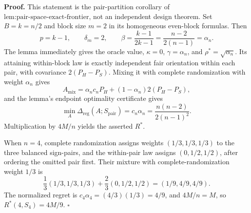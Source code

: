 \textbf{Proof.}
This statement is the pair-partition corollary of \(\text{lem:pair-space-exact-frontier}\), not an independent design theorem.  Set \(B=k=n/2\) and block size \(m=2\) in its homogeneous even-block formulas.  Then
\[
p=k-1,\qquad \delta_m=2,\qquad
\beta=\frac{k-1}{2k-1}=\frac{n-2}{2(n-1)}=\alpha_n.
\]
The lemma immediately gives the oracle value, \(\kappa=0\), \(\gamma=\alpha_n\), and \(\rho^*=\sqrt{\alpha_n}\).  Its attaining within-block law is exactly independent fair orientation within each pair, with covariance \(2(P_H-P_S)\).  Mixing it with complete randomization with weight \(\alpha_n\) gives
\[
A_{\mathrm{mix}}=\alpha_nc_nP_H+(1-\alpha_n)2(P_H-P_S),
\]
and the lemma's endpoint optimality certificate gives
\[
\min_A\Delta_{\mathrm{reg}}(A;S_{\mathrm{pair}})
=c_n\alpha_n=\frac{n(n-2)}{2(n-1)^2}.
\]
Multiplication by \(4M/n\) yields the asserted \(R^*\).

When \(n=4\), complete randomization assigns weights \((1/3,1/3,1/3)\) to the three balanced sign-pairs, and the within-pair law assigns \((0,1/2,1/2)\), after ordering the omitted pair first.  Their mixture with complete-randomization weight \(1/3\) is
\[
\frac13(1/3,1/3,1/3)+\frac23(0,1/2,1/2)
=(1/9,4/9,4/9).
\]
The normalized regret is \(c_4\alpha_4=(4/3)(1/3)=4/9\), and \(4M/n=M\), so \(R^*(4,S_4)=4M/9\). \(\square\)